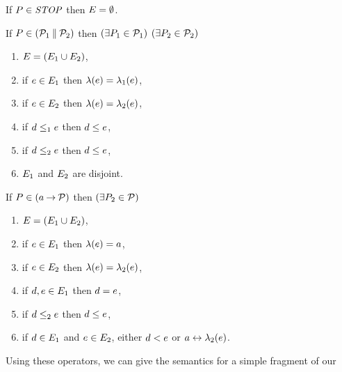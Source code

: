 \begin{definition} $\phantom{\;}$\par
\label{tab:pomsets}

  \noindent
  If $\aPS\SB0\in\sSTOP$ then $\aEvs\SB0 = \emptyset$.

  \noindent
  If $\aPS\SB0 \in (\aPSS_1\sPAR\aPSS_2)$ then  
  $(\exists\aPS_1\in\aPSS_1)$ $(\exists\aPS_2\in\aPSS_2)$
  \begin{enumerate}
  \item $\aEvs\SB0 = (\aEvs_1\cup\aEvs_2)$,
  \item if $\aEv\in\aEvs_1$ then $\labeling\SB0(\aEv) = \labeling_1(\aEv)$, 
  \item if $\aEv\in\aEvs_2$ then $\labeling\SB0(\aEv) = \labeling_2(\aEv)$,
  \item if $\bEv\le_1\aEv$ then $\bEv\le\SB0\aEv$, 
  \item if $\bEv\le_2\aEv$ then $\bEv\le\SB0\aEv$, 
    \setcounter{pomsetParCount}{\value{enumi}}
  \item $\aEvs_1$ and $\aEvs_2$ are disjoint.
    \setcounter{pomsetParDisjointCount}{\value{enumi}}
  \end{enumerate}

  \noindent
  If $\aPS\SB0 \in (\aAct\sPREFIX\aPSS)$ then
  $(\exists\aPS_2\in\aPSS)$
  \begin{enumerate}
  \item $\aEvs\SB0=(\aEvs_1 \cup \aEvs_2)$,
  \item if $\aEv\in\aEvs_1$ then $\labelingAct\SB0(\aEv) = \aAct$,
  \item if $\aEv\in\aEvs_2$ then $\labelingAct\SB0(\aEv) = \labelingAct_2(\aEv)$,
  \item if $\bEv,\aEv\in\aEvs_1$ then $\bEv=\aEv$,
  \item if $\bEv\le_2\aEv$ then $\bEv\le\SB0\aEv$, 
  \item if $\bEv\in\aEvs_1$ and $\aEv\in\aEvs_2$, either $\bEv<\SB0\aEv$ or $a\reorder\labeling_2(\aEv)$.
    \setcounter{pomsetPrefixOrderCount}{\value{enumi}}
  \end{enumerate}
\end{definition}
Using these operators, we can give the semantics for a simple fragment of our
